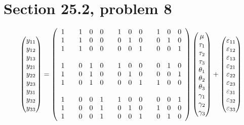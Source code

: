 \section{Section 25.2, problem 8}
$$\left(\begin{matrix}
y_{11}\cr
y_{12}\cr
y_{13}\cr
y_{21}\cr
y_{22}\cr
y_{23}\cr
y_{31}\cr
y_{32}\cr
y_{33}
\end{matrix}\right)=\left(\begin{array}{ccccccccccccc}
1 && 1 & 0 & 0 && 1 & 0 & 0 && 1 & 0 & 0\cr
1 && 1 & 0 & 0 && 0 & 1 & 0 && 0 & 1 & 0\cr
1 && 1 & 0 & 0 && 0 & 0 & 1 && 0 & 0 & 1\cr
\cr
1 && 0 & 1 & 0 && 1 & 0 & 0 && 0 & 1 & 0\cr
1 && 0 & 1 & 0 && 0 & 1 & 0 && 0 & 0 & 1\cr
1 && 0 & 1 & 0 && 0 & 0 & 1 && 1 & 0 & 0\cr
\cr
1 && 0 & 0 & 1 && 1 & 0 & 0 && 0 & 0 & 1\cr
1 && 0 & 0 & 1 && 0 & 1 & 0 && 1 & 0 & 0\cr
1 && 0 & 0 & 1 && 0 & 0 & 1 && 0 & 1 & 0\cr
\end{array}\right)\left(\begin{matrix}
\mu\cr
\tau_1\cr
\tau_2\cr
\tau_3\cr
\theta_1\cr
\theta_2\cr
\theta_3\cr
\gamma_1\cr
\gamma_2\cr
\gamma_3
\end{matrix}\right)+\left(\begin{matrix}
\varepsilon_{11}\cr
\varepsilon_{12}\cr
\varepsilon_{13}\cr
\varepsilon_{21}\cr
\varepsilon_{22}\cr
\varepsilon_{23}\cr
\varepsilon_{31}\cr
\varepsilon_{32}\cr
\varepsilon_{33}
\end{matrix}\right)
$$
